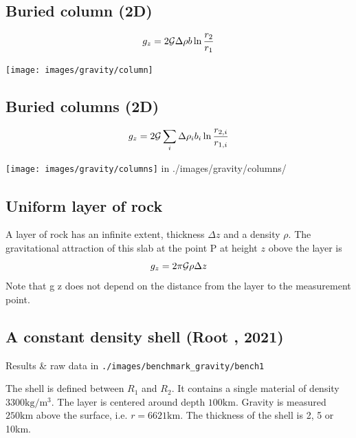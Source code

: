 \subsection{Buried column (2D)}

\[
g_z=2 {\cal G} \Delta \rho b \ln \frac{r_2}{r_1}
\]

\begin{center}
\texttt{[image: images/gravity/column]}
\end{center}

\subsection{Buried columns (2D)}

\[
g_z=2 {\cal G} \sum_i  \Delta \rho_i  b_i  \ln \frac{r_{2,i}}{r_{1,i}}
\]

\begin{center}
\texttt{[image: images/gravity/columns]}
{\tiny {\color{gray} in ./images/gravity/columns/}}
\end{center}





\subsection{Uniform layer of rock}

A layer of rock has an infinite extent, thickness $\Delta z$ 
and a density $\rho$. The gravitational
attraction of this slab at the point P at height $z$ obove the layer is 
\[
g_z=2 \pi {\cal G} \rho \Delta z
\]
Note that g z does not depend on the distance from the layer to the measurement point.



\newpage
\subsection{A constant density shell (Root \etal, 2021)}

Results \& raw data in {\tt ./images/benchmark\_gravity/bench1}

The shell is defined between $R_1$ and $R_2$. It contains a single material of 
density $3300\si{\kilogram\per\cubic\meter}$. The layer is centered around depth $100\si{\kilo\metre}$.
Gravity is measured $250\si{\kilo\metre}$ above the surface, i.e. $r=6621\si{\kilo\metre}$.
The thickness of the shell is 2, 5 or 10km.  

